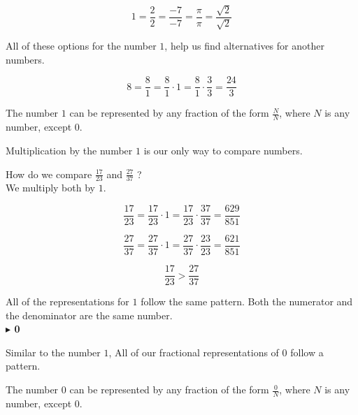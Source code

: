 \documentclass{ximera}
\begin{document}
\[
1 = \frac{2}{2} = \frac{-7}{-7} = \frac{\pi}{\pi} = \frac{\sqrt{2}}{\sqrt{2}} 
\]


All of these options for the number $1$, help us find alternatives for another numbers.


\[
8 = \frac{8}{1} = \frac{8}{1} \cdot 1 = \frac{8}{1} \cdot \frac{3}{3} = \frac{24}{3}
\]




\begin{idea}

The number $1$ can be represented by any fraction of the form $\frac{N}{N}$, where $N$ is any number, except $0$.


\end{idea}







Multiplication by the number $1$ is our only way to compare numbers.




\begin{example}

How do we compare $\frac{17}{23}$ and $\frac{27}{37}$ ? \\

We multiply both by $1$.


\[
\frac{17}{23} = \frac{17}{23} \cdot 1 = \frac{17}{23} \cdot \frac{37}{37} = \frac{629}{851}
\]


\[
\frac{27}{37} = \frac{27}{37} \cdot 1 = \frac{27}{37} \cdot \frac{23}{23} = \frac{621}{851}
\]



\[
\frac{17}{23} > \frac{27}{37}
\]


\end{example}


All of the representations for $1$ follow the same pattern.  Both the numerator and the denominator are the same number. \\




\textbf{\textcolor{purple!85!blue}{$\blacktriangleright$ 0}} 


Similar to the number $1$, All of our fractional representations of $0$ follow a pattern.






\begin{idea}

The number $0$ can be represented by any fraction of the form $\frac{0}{N}$, where $N$ is any number, except $0$.


\end{idea}
\end{document}
